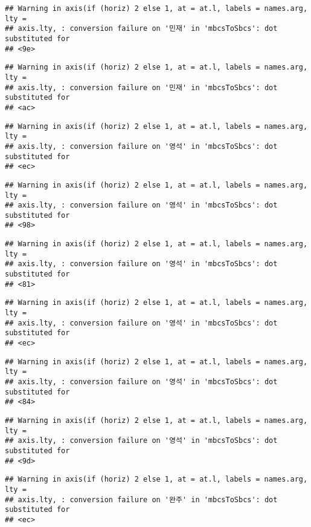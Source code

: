 \documentclass[
]{article}
\begin{document}
\begin{verbatim}
## Warning in axis(if (horiz) 2 else 1, at = at.l, labels = names.arg, lty =
## axis.lty, : conversion failure on '민재' in 'mbcsToSbcs': dot substituted for
## <9e>
\end{verbatim}

\begin{verbatim}
## Warning in axis(if (horiz) 2 else 1, at = at.l, labels = names.arg, lty =
## axis.lty, : conversion failure on '민재' in 'mbcsToSbcs': dot substituted for
## <ac>
\end{verbatim}

\begin{verbatim}
## Warning in axis(if (horiz) 2 else 1, at = at.l, labels = names.arg, lty =
## axis.lty, : conversion failure on '영석' in 'mbcsToSbcs': dot substituted for
## <ec>
\end{verbatim}

\begin{verbatim}
## Warning in axis(if (horiz) 2 else 1, at = at.l, labels = names.arg, lty =
## axis.lty, : conversion failure on '영석' in 'mbcsToSbcs': dot substituted for
## <98>
\end{verbatim}

\begin{verbatim}
## Warning in axis(if (horiz) 2 else 1, at = at.l, labels = names.arg, lty =
## axis.lty, : conversion failure on '영석' in 'mbcsToSbcs': dot substituted for
## <81>
\end{verbatim}

\begin{verbatim}
## Warning in axis(if (horiz) 2 else 1, at = at.l, labels = names.arg, lty =
## axis.lty, : conversion failure on '영석' in 'mbcsToSbcs': dot substituted for
## <ec>
\end{verbatim}

\begin{verbatim}
## Warning in axis(if (horiz) 2 else 1, at = at.l, labels = names.arg, lty =
## axis.lty, : conversion failure on '영석' in 'mbcsToSbcs': dot substituted for
## <84>
\end{verbatim}

\begin{verbatim}
## Warning in axis(if (horiz) 2 else 1, at = at.l, labels = names.arg, lty =
## axis.lty, : conversion failure on '영석' in 'mbcsToSbcs': dot substituted for
## <9d>
\end{verbatim}

\begin{verbatim}
## Warning in axis(if (horiz) 2 else 1, at = at.l, labels = names.arg, lty =
## axis.lty, : conversion failure on '완주' in 'mbcsToSbcs': dot substituted for
## <ec>
\end{verbatim}
\end{document}
